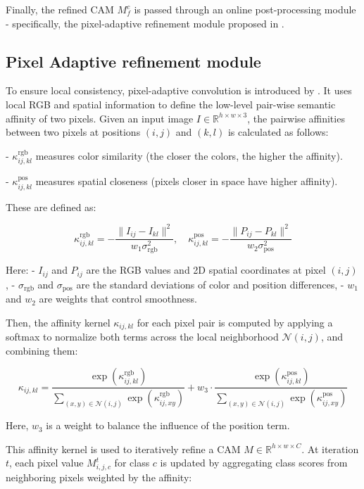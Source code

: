 Finally, the refined CAM $M^c_f$ is passed through an online post-processing module - specifically, the pixel-adaptive refinement module proposed in \cite{wsss_afa_affinity_from_attention}.

\subsection{Pixel Adaptive refinement module}
\label{subsec:par}
To ensure local consistency, pixel-adaptive convolution is introduced by \cite{wsss_afa_affinity_from_attention}. It uses local RGB and spatial information to define the low-level pair-wise semantic affinity of two pixels. Given an input image \( I \in \mathbb{R}^{h \times w \times 3} \), the pairwise affinities between two pixels at positions \((i, j)\) and \((k, l)\) is calculated as follows:

- \( \kappa^{\text{rgb}}_{ij,kl} \) measures color similarity (the closer the colors, the higher the affinity).

- \( \kappa^{\text{pos}}_{ij,kl} \) measures spatial closeness (pixels closer in space have higher affinity).

These are defined as:

\[
    \kappa^{\text{rgb}}_{ij,kl} = -\frac{\| I_{ij} - I_{kl} \|^2}{w_1 \sigma^2_{\text{rgb}}}, \quad
    \kappa^{\text{pos}}_{ij,kl} = -\frac{\| P_{ij} - P_{kl} \|^2}{w_2 \sigma^2_{\text{pos}}}
\]

Here:
- \( I_{ij} \) and \( P_{ij} \) are the RGB values and 2D spatial coordinates at pixel \((i, j)\),
- \( \sigma_{\text{rgb}} \) and \( \sigma_{\text{pos}} \) are the standard deviations of color and position differences,
- \( w_1 \) and \( w_2 \) are weights that control smoothness.

Then, the affinity kernel \( \kappa_{ij,kl} \) for each pixel pair is computed by applying a softmax to normalize both terms across the local neighborhood \( \mathcal{N}(i, j) \), and combining them:

\[
    \kappa_{ij,kl} = \frac{ \exp(\kappa^{\text{rgb}}_{ij,kl}) }{ \sum\limits_{(x, y) \in \mathcal{N}(i, j)} \exp(\kappa^{\text{rgb}}_{ij,xy}) }
    + w_3 \cdot \frac{ \exp(\kappa^{\text{pos}}_{ij,kl}) }{ \sum\limits_{(x, y) \in \mathcal{N}(i, j)} \exp(\kappa^{\text{pos}}_{ij,xy}) }
\]

Here, \( w_3 \) is a weight to balance the influence of the position term.

This affinity kernel is used to iteratively refine a CAM \( M \in \mathbb{R}^{h \times w \times C} \). At iteration \( t \), each pixel value \( M^t_{i,j,c} \) for class \( c \) is updated by aggregating class scores from neighboring pixels weighted by the affinity:

